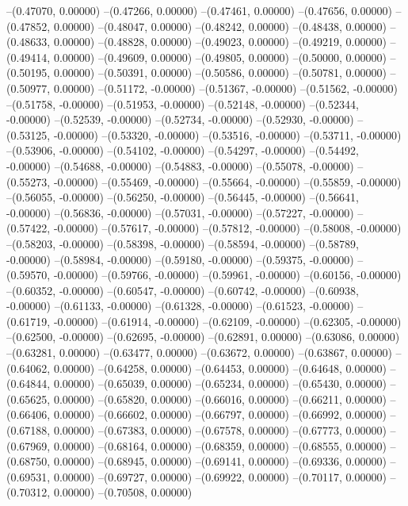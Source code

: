 --(0.47070, 0.00000)
--(0.47266, 0.00000)
--(0.47461, 0.00000)
--(0.47656, 0.00000)
--(0.47852, 0.00000)
--(0.48047, 0.00000)
--(0.48242, 0.00000)
--(0.48438, 0.00000)
--(0.48633, 0.00000)
--(0.48828, 0.00000)
--(0.49023, 0.00000)
--(0.49219, 0.00000)
--(0.49414, 0.00000)
--(0.49609, 0.00000)
--(0.49805, 0.00000)
--(0.50000, 0.00000)
--(0.50195, 0.00000)
--(0.50391, 0.00000)
--(0.50586, 0.00000)
--(0.50781, 0.00000)
--(0.50977, 0.00000)
--(0.51172, -0.00000)
--(0.51367, -0.00000)
--(0.51562, -0.00000)
--(0.51758, -0.00000)
--(0.51953, -0.00000)
--(0.52148, -0.00000)
--(0.52344, -0.00000)
--(0.52539, -0.00000)
--(0.52734, -0.00000)
--(0.52930, -0.00000)
--(0.53125, -0.00000)
--(0.53320, -0.00000)
--(0.53516, -0.00000)
--(0.53711, -0.00000)
--(0.53906, -0.00000)
--(0.54102, -0.00000)
--(0.54297, -0.00000)
--(0.54492, -0.00000)
--(0.54688, -0.00000)
--(0.54883, -0.00000)
--(0.55078, -0.00000)
--(0.55273, -0.00000)
--(0.55469, -0.00000)
--(0.55664, -0.00000)
--(0.55859, -0.00000)
--(0.56055, -0.00000)
--(0.56250, -0.00000)
--(0.56445, -0.00000)
--(0.56641, -0.00000)
--(0.56836, -0.00000)
--(0.57031, -0.00000)
--(0.57227, -0.00000)
--(0.57422, -0.00000)
--(0.57617, -0.00000)
--(0.57812, -0.00000)
--(0.58008, -0.00000)
--(0.58203, -0.00000)
--(0.58398, -0.00000)
--(0.58594, -0.00000)
--(0.58789, -0.00000)
--(0.58984, -0.00000)
--(0.59180, -0.00000)
--(0.59375, -0.00000)
--(0.59570, -0.00000)
--(0.59766, -0.00000)
--(0.59961, -0.00000)
--(0.60156, -0.00000)
--(0.60352, -0.00000)
--(0.60547, -0.00000)
--(0.60742, -0.00000)
--(0.60938, -0.00000)
--(0.61133, -0.00000)
--(0.61328, -0.00000)
--(0.61523, -0.00000)
--(0.61719, -0.00000)
--(0.61914, -0.00000)
--(0.62109, -0.00000)
--(0.62305, -0.00000)
--(0.62500, -0.00000)
--(0.62695, -0.00000)
--(0.62891, 0.00000)
--(0.63086, 0.00000)
--(0.63281, 0.00000)
--(0.63477, 0.00000)
--(0.63672, 0.00000)
--(0.63867, 0.00000)
--(0.64062, 0.00000)
--(0.64258, 0.00000)
--(0.64453, 0.00000)
--(0.64648, 0.00000)
--(0.64844, 0.00000)
--(0.65039, 0.00000)
--(0.65234, 0.00000)
--(0.65430, 0.00000)
--(0.65625, 0.00000)
--(0.65820, 0.00000)
--(0.66016, 0.00000)
--(0.66211, 0.00000)
--(0.66406, 0.00000)
--(0.66602, 0.00000)
--(0.66797, 0.00000)
--(0.66992, 0.00000)
--(0.67188, 0.00000)
--(0.67383, 0.00000)
--(0.67578, 0.00000)
--(0.67773, 0.00000)
--(0.67969, 0.00000)
--(0.68164, 0.00000)
--(0.68359, 0.00000)
--(0.68555, 0.00000)
--(0.68750, 0.00000)
--(0.68945, 0.00000)
--(0.69141, 0.00000)
--(0.69336, 0.00000)
--(0.69531, 0.00000)
--(0.69727, 0.00000)
--(0.69922, 0.00000)
--(0.70117, 0.00000)
--(0.70312, 0.00000)
--(0.70508, 0.00000)
